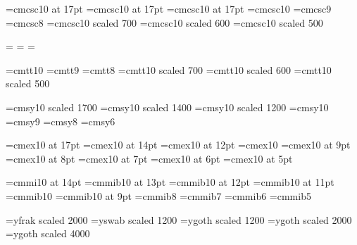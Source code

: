 \def\scalb{\fam\scalbfam\tenscalb}




\font\seventeenpcap=cmcsc10 at 17pt
\font\fourteenpcap=cmcsc10 at 17pt
\font\twelvepcap=cmcsc10 at 17pt
\font\tenpcap=cmcsc10
\font\ninepcap=cmcsc9
\font\eightpcap=cmcsc8
\font\sevenpcap=cmcsc10 scaled 700
\font\sixpcap=cmcsc10 scaled 600
\font\fivepcap=cmcsc10 scaled 500

\newfam\pcapfam
\textfont\pcapfam=\tenpcap
\scriptfont\pcapfam=\sevenpcap
\scriptscriptfont\pcapfam=\fivepcap

\def\pcap{\fam\pcapfam\tenpcap}

% 

\font\tentt=cmtt10
\font\ninett=cmtt9                 
\font\eighttt=cmtt8
\font\seventt=cmtt10 scaled 700
\font\sixtt=cmtt10 scaled 600
\font\fivett=cmtt10 scaled 500

% 

\font\seventeensy=cmsy10 scaled 1700
\font\fourteensy=cmsy10 scaled 1400
\font\twelvesy=cmsy10 scaled 1200
\font\tensy=cmsy10
\font\ninesy=cmsy9
\font\eightsy=cmsy8
\font\sixsy=cmsy6


% 

\font\seventeenex=cmex10 at 17pt
\font\fourteenex=cmex10 at 14pt
\font\twelveex=cmex10 at 12pt
\font\tenex=cmex10
\font\nineex=cmex10 at 9pt
\font\eightex=cmex10 at 8pt
\font\sevenex=cmex10 at 7pt
\font\sixex=cmex10 at 6pt
\font\fiveex=cmex10 at 5pt

% 

\font\fourteengp=cmmi10 at 14pt
\font\thirteengp=cmmib10 at 13pt
\font\twelvegp=cmmib10 at 12pt
\font\elevengp=cmmib10 at 11pt
\font\tengp=cmmib10
\font\ninegp=cmmib10 at 9pt
\font\eightgp=cmmib8
\font\sevengp=cmmib7
\font\sixgp=cmmib6
\font\fivegp=cmmib5

% 

\font\yfrak=yfrak scaled 2000
\font\yswab=yswab scaled 1200
\font\twelveygoth=ygoth scaled 1200
\font\twentyygoth=ygoth scaled 2000
\font\thirtyygoth=ygoth scaled 4000





